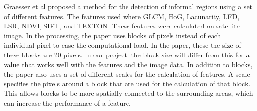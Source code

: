 
Graesser et al proposed a method for the detection of informal regions using
a set of different features. The features used where GLCM, HoG, Lacunarity,
LFD, LSR, NDVI, SIFT, and TEXTON. These features were calculated on satellite
image. In the processing, the paper uses blocks of pixels instead of each
individual pixel to ease the computational load. In the paper, these the size
of these blocks are 20 pixels. In our project, the block size will differ from
this for a value that works well with the features and the image data.
In addition to blocks, the paper also uses a set of different scales for the
calculation of features. A scale specifies the pixels around a block that
are used for the calculation of that block. This allows blocks to be more
spatially connected to the surrounding areas, which can increase the
performance of a feature. 


